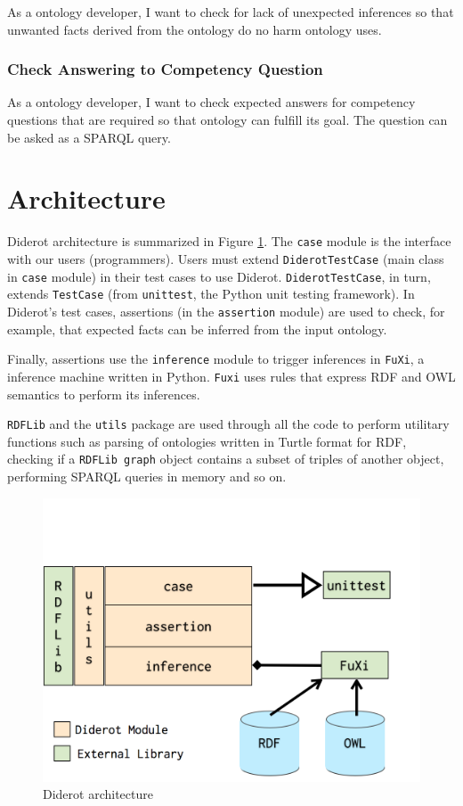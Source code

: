 \documentclass{report}
\begin{document}
As a ontology developer, I want to check for lack of unexpected inferences so that unwanted facts
derived from the ontology do no harm ontology uses.

\subsubsection{Check Answering to Competency Question}

As a ontology developer, I want to check expected answers for competency questions that are required
so that ontology can fulfill its goal. The question can be asked as a SPARQL query.

\section{Architecture}

Diderot architecture is summarized in Figure \ref{figArchitecture}.
The \texttt{case} module is the interface with our users (programmers).
Users must extend \texttt{DiderotTestCase} (main class in \texttt{case} module) in their test cases to use Diderot.
\texttt{DiderotTestCase}, in turn, extends \texttt{TestCase} (from \texttt{unittest}, the Python unit testing framework).
In Diderot's test cases, assertions (in the \texttt{assertion} module) are used to check, for example, that expected facts can be inferred from the input ontology.

Finally, assertions use the \texttt{inference} module to trigger inferences in \texttt{FuXi}, a inference machine written in Python.
\texttt{Fuxi} uses rules that express RDF and OWL semantics to perform its inferences.

\texttt{RDFLib} and the \texttt{utils} package are used through all the code to perform utilitary functions such as parsing of ontologies written in Turtle format for RDF, checking if a \texttt{RDFLib graph} object contains a subset of triples of another object, performing SPARQL queries in memory and so on.

\begin{figure}[!hbt]
    \centering
    \label{figArchitecture}
    \caption{Diderot architecture}
    \includegraphics[scale=0.33]{fig/architecture.png}
\end{figure}
\end{document}
